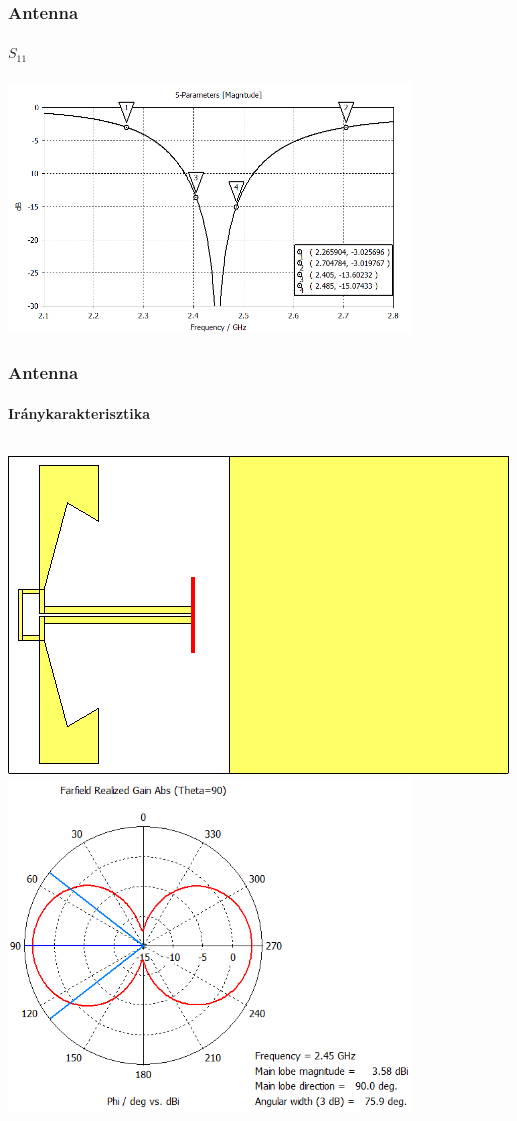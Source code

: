 \documentclass[aspectratio=169]{beamer}
\begin{document}
\begin{frame}
	\frametitle{Antenna}
	\framesubtitle{$S_{11}$}
		\centering
		\includegraphics[width=0.8\textwidth]{bifa_broadband_S11_dB.png}
\end{frame}
\begin{frame}
	\frametitle{Antenna}
	\framesubtitle{Iránykarakterisztika}
		\begin{columns}
				\centering
				\includegraphics[width=\textwidth]{lying_bifa_bb_3D.png}
				\centering
				\includegraphics[width=0.8\textwidth]{bifa_broadband_pattern_theta90.png}
		\end{columns}
\end{frame}
\end{document}
